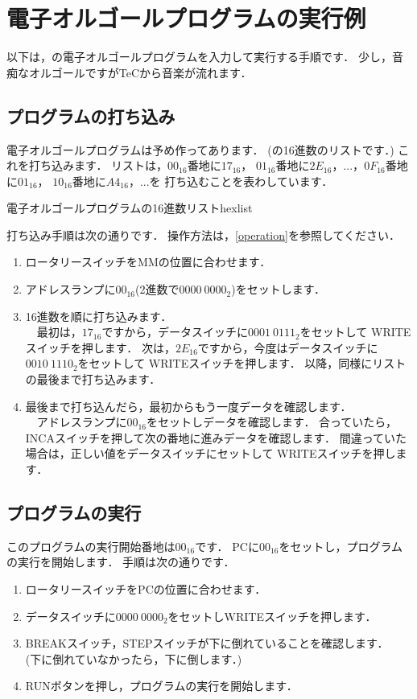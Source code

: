 \renewcommand{\myincludegraphics}[2]{\texttt{[image: appA/\#1]}}

\chapter{電子オルゴールプログラムの実行例}
以下は，の電子オルゴールプログラムを入力して実行する手順です．
少し，音痴なオルゴールですがTeCから音楽が流れます．

\section{プログラムの打ち込み}
電子オルゴールプログラムは予め作ってあります．
(の16進数のリストです．)
これを打ち込みます．
リストは，$00_{16}$番地に$17_{16}$，
$01_{16}$番地に$2E_{16}$，...，$0F_{16}$番地に$01_{16}$，
$10_{16}$番地に$A4_{16}$，...を
打ち込むことを表わしています．

{電子オルゴールプログラムの16進数リスト}{hexlist}

打ち込み手順は次の通りです．
操作方法は，\ref{operation}を参照してください．
\begin{enumerate}
\item ロータリースイッチをMMの位置に合わせます．
\item アドレスランプに$00_{16}$(2進数で$0000~0000_{2}$)をセットします．
\item 16進数を順に打ち込みます．\\
　最初は，$17_{16}$ですから，データスイッチに$0001~0111_{2}$をセットして
WRITEスイッチを押します．
次は，$2E_{16}$ですから，今度はデータスイッチに$0010~1110_{2}$をセットして
WRITEスイッチを押します．
以降，同様にリストの最後まで打ち込みます．
\item 最後まで打ち込んだら，最初からもう一度データを確認します．\\
　アドレスランプに$00_{16}$をセットしデータを確認します．
合っていたら，INCAスイッチを押して次の番地に進みデータを確認します．
間違っていた場合は，正しい値をデータスイッチにセットして
WRITEスイッチを押します．
\end{enumerate}

\section{プログラムの実行}
このプログラムの実行開始番地は$00_{16}$です．
PCに$00_{16}$をセットし，プログラムの実行を開始します．
手順は次の通りです．
\begin{enumerate}
\item ロータリースイッチをPCの位置に合わせます．
\item データスイッチに$0000~0000_{2}$をセットしWRITEスイッチを押します．
\item BREAKスイッチ，STEPスイッチが下に倒れていることを確認します．\\
(下に倒れていなかったら，下に倒します．)
\item RUNボタンを押し，プログラムの実行を開始します．
\end{enumerate}

